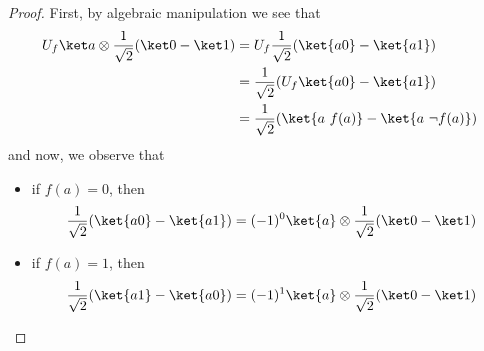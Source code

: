 \documentclass[a4paper, 12pt]{report}
\begin{document}
\begin{proof}
    First, by algebraic manipulation we see that
    \begin{equation*}
        \begin{split}
            U_f \ket a \otimes \dfrac{1}{\sqrt 2}(\ket 0 - \ket 1) & = U_f \dfrac{1}{\sqrt 2}(\ket{a0} - \ket{a1}) \\ 
                                                                   & = \dfrac{1}{\sqrt 2}(U_f \ket{a0} - \ket{a1}) \\ 
                                                                   & = \dfrac{1}{\sqrt 2}(\ket{a \ f(a)} - \ket{a \ \lnot f(a)}) \\ 
        \end{split}
    \end{equation*}
    and now, we observe that

    \begin{itemize}
        \item if $f(a) = 0$, then $$\dfrac{1}{\sqrt 2}(\ket{a0} - \ket{a1}) = (-1)^0 \ket{a} \otimes \dfrac{1}{\sqrt 2}(\ket 0 - \ket 1)$$
        \item if $f(a) = 1$, then $$\dfrac{1}{\sqrt 2}(\ket{a1} - \ket{a0}) = (-1)^1 \ket{a} \otimes \dfrac{1}{\sqrt 2}(\ket 0 - \ket 1)$$
    \end{itemize}
\end{proof}
\end{document}
